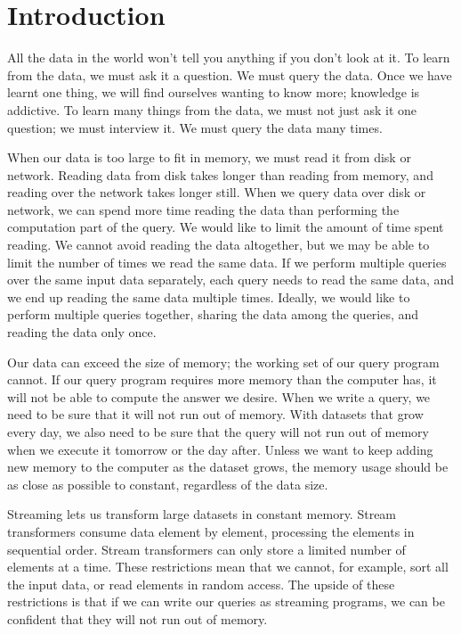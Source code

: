\chapter{Introduction}
\label{chapter:introduction}

All the data in the world won't tell you anything if you don't look at it.
To learn from the data, we must ask it a question.
We must query the data.
Once we have learnt one thing, we will find ourselves wanting to know more; knowledge is addictive.
To learn many things from the data, we must not just ask it one question; we must interview it.
We must query the data many times.

When our data is too large to fit in memory, we must read it from disk or network.
Reading data from disk takes longer than reading from memory, and reading over the network takes longer still.
When we query data over disk or network, we can spend more time reading the data than performing the computation part of the query.
We would like to limit the amount of time spent reading.
We cannot avoid reading the data altogether, but we may be able to limit the number of times we read the same data.
If we perform multiple queries over the same input data separately, each query needs to read the same data, and we end up reading the same data multiple times.
Ideally, we would like to perform multiple queries together, sharing the data among the queries, and reading the data only once.

Our data can exceed the size of memory; the working set of our query program cannot.
If our query program requires more memory than the computer has, it will not be able to compute the answer we desire.
When we write a query, we need to be sure that it will not run out of memory.
With datasets that grow every day, we also need to be sure that the query will not run out of memory when we execute it tomorrow or the day after.
Unless we want to keep adding new memory to the computer as the dataset grows, the memory usage should be as close as possible to constant, regardless of the data size.

Streaming lets us transform large datasets in constant memory.
Stream transformers consume data element by element, processing the elements in sequential order.
Stream transformers can only store a limited number of elements at a time.
These restrictions mean that we cannot, for example, sort all the input data, or read elements in random access.
The upside of these restrictions is that if we can write our queries as streaming programs, we can be confident that they will not run out of memory.

